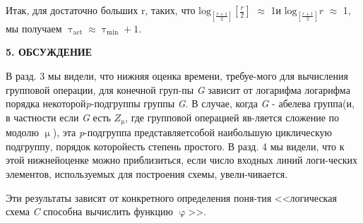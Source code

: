 \documentclass[a4paper, twoside]{article}
\begin{document}
\begin{spacing}{0.9}
Итак, для достаточно больших r, таких, что $\text{log}_{\left[\frac{r+1}{2}\right]}\left[\frac{r}{2}\right]$ $\approx$ 1\linebreak[4] и $\text{log}_{\left[\frac{r+1}{2}\right]}r$ $\approx$ 1, мы получаем $\uptau_{\text{act}} \approx \uptau_{\text{min}} + 1$. 
\end{spacing}

\begin{center}
\large\textbf{5. ОБСУЖДЕНИЕ}
\end{center}

\begin{spacing}{0.9}
\par В разд. 3 мы видели, что нижняя оценка времени, требуе-\linebreak[4]мого для вычисления групповой операции, для конечной груп-\linebreak[4]пы \textit{G} зависит от логарифма логарифма порядка некоторой\linebreak[4] \textit{p}-подгруппы группы \textit{G}. В случае, когда \textit{G} - абелева группа\linebreak[4] (и, в частности если \textit{G} есть $Z_{\upmu}$, где групповой операцией яв-\linebreak[4]ляется сложение по модолю $\upmu$), эта \textit{p}-подгруппа представляет\linebreak[4] собой наибольшую циклическую подгруппу, порядок которой\linebreak[4] есть степень простого. В разд. 4 мы видели, что к этой нижней\linebreak[4] оценке можно приблизиться, если число входных линий логи-\linebreak[4]ческих элементов, используемых для построения схемы, увели-\linebreak[4]чивается.
\end{spacing}

\begin{spacing}{0.9}
\par Эти результаты зависят от конкретного определения поня-\linebreak[4]тия <<логическая схема \textit{C} способна вычислить функцию $\upvarphi$>>. \linebreak[4]
\end{spacing}

\end{document}

